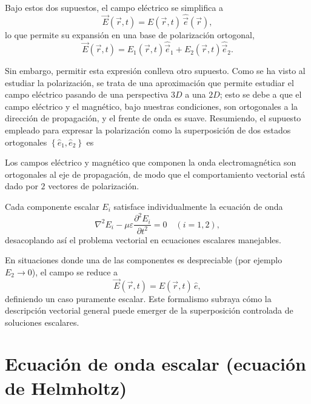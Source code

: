 	Bajo estos dos supuestos, el campo eléctrico se simplifica a
	\begin{equation}
	\vec{E}(\vec{r},t) = E(\vec{r},t) \, \hat{\vec{e}}(\vec{r}),
	\end{equation}
	lo que permite su expansión en una base de polarización ortogonal,
	\begin{equation}
	\vec{E}(\vec{r},t) = E_1(\vec{r},t)\hat{\vec{e}}_1 + E_2(\vec{r},t)\hat{\vec{e}}_2.
	\end{equation}

	Sin embargo, permitir esta expresión conlleva otro supuesto. Como se ha visto al estudiar la polarización, se trata de una aproximación que permite estudiar el campo eléctrico pasando de una perspectiva $3D$ a una $2D$; esto se debe a que el campo eléctrico y el magnético, bajo nuestras condiciones, son ortogonales a la dirección de propagación, y el frente de onda es suave. Resumiendo, el supuesto empleado para expresar la polarización como la superposición de dos estados ortogonales $\left\{\hat{e}_1, \hat{e}_2 \right\}$ es

	\begin{Assumption}
		Los campos eléctrico y magnético que componen la onda electromagnética son ortogonales al eje de propagación, de modo que el comportamiento vectorial está dado por $2$ vectores de polarización.
	\end{Assumption}

	Cada componente escalar $E_i$ satisface individualmente la ecuación de onda
	\begin{equation}
	\nabla^2 E_i - \mu\varepsilon \frac{\partial^2 E_i}{\partial t^2} = 0 \quad (i=1,2),
	\end{equation}
	desacoplando así el problema vectorial en ecuaciones escalares manejables.

	En situaciones donde una de las componentes es despreciable (por ejemplo $E_2 \to 0$), el campo se reduce a
	\begin{equation}
		\vec{E}(\vec{r},t) = E(\vec{r},t) \, \hat{e},
	\end{equation}
	definiendo un caso puramente escalar. Este formalismo subraya cómo la descripción vectorial general puede emerger de la superposición controlada de soluciones escalares.

\section{Ecuación de onda escalar (ecuación de Helmholtz)}

